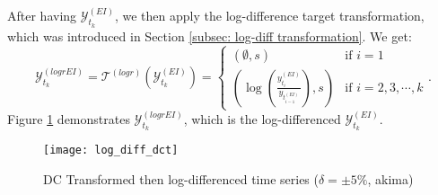After having $\mathcal{Y}^{(EI)}_{t_k}$, we then apply the log-difference target transformation, which was introduced in Section \ref{subsec: log-diff transformation}. We get:
\begin{equation*}
    \mathcal{Y}^{(logrEI)}_{t_k} = \mathcal{T}^{(logr)}(\mathcal{Y}^{(EI)}_{t_k}) = \begin{cases}
        (\emptyset, s)  &\text{if $i = 1$} \\
        (\log(\frac{y^{(EI)}_{t_i}}{y_{t^{(EI)}_{i-1}}}), s) &\text{if $i = 2, 3, \cdots, k$}
    \end{cases}.
\end{equation*}
Figure \ref{fig: log-diff dct} demonstrates $\mathcal{Y}^{(logrEI)}_{t_k}$, which is the log-differenced $\mathcal{Y}^{(EI)}_{t_k}$.
\begin{figure}[H]
    \centering
    \texttt{[image: log\_diff\_dct]}
    \caption{DC Transformed then log-differenced time series ($\delta = \pm 5\%$, akima)}
    {\raggedright \footnotesize \par}
    \label{fig: log-diff dct}
\end{figure}

